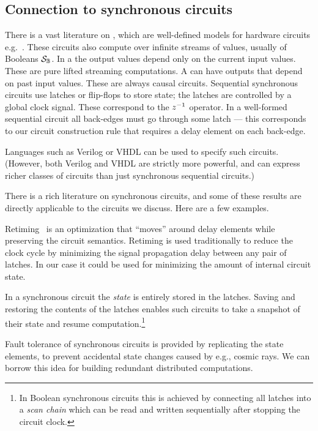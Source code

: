 \subsection{Connection to synchronous circuits}

There is a vast literature on , which are well-defined
models for hardware circuits e.g.~\cite{gammie-acs13}.  These circuits also compute over infinite streams of values,
usually of Booleans $\mathcal{S}_{\mathbb{B}}$.  In a  the output
values depend only on the current input values.  These are pure lifted streaming
computations.  A  can have outputs that depend on past
input values.  These are always causal circuits.  Sequential synchronous circuits use
latches or flip-flops to store state; the latches are controlled by a global clock signal.
These correspond to the $z^{-1}$ operator.  In a well-formed sequential circuit all back-edges
must go through some latch --- this corresponds to our circuit construction rule that
requires a delay element on each back-edge.

Languages such as Verilog or VHDL can be used to specify such circuits.  (However, both Verilog
and VHDL are strictly more powerful, and can express richer classes of circuits than just
synchronous sequential circuits.)

There is a rich literature on synchronous circuits, and some of these results are
directly applicable to the circuits we discuss.  Here are a few examples.

Retiming~\cite{leiserson-algorithmica91}
is an optimization that ``moves'' around delay elements while preserving the circuit
semantics.  Retiming is used traditionally to reduce the clock cycle by minimizing
the signal propagation delay between any pair of latches.  In our case it could be
used for minimizing the amount of internal circuit state.

In a synchronous circuit the \emph{state} is entirely stored in the latches.  
Saving and restoring the contents of the latches enables such circuits to take
a snapshot of their state and resume computation.\footnote{In Boolean
synchronous circuits this is achieved by connecting all latches into a \emph{scan 
chain} which can be read and written sequentially after stopping the circuit clock.}

Fault tolerance of synchronous
circuits is provided by replicating the state elements, to prevent accidental
state changes caused by e.g., cosmic rays.  We can borrow this idea for building
redundant distributed computations.

